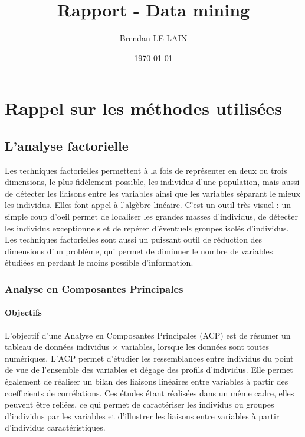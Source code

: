 \documentclass[a4paper]{report}
\title {Rapport - Data mining}
\author {Brendan LE LAIN}
\date{\today}
\begin{document}
 
\pagestyle{headings}
 
\maketitle
 
\chapter{Rappel sur les méthodes utilisées}

\section{L'analyse factorielle}
Les techniques factorielles permettent à la fois de représenter en deux ou trois dimensions, le plus fidèlement possible, les individus d'une population, mais aussi de détecter les liaisons entre les variables ainsi que les variables séparant le mieux les individus. Elles font appel à l'algèbre linéaire. C'est un outil très visuel : un simple coup d'oeil permet de localiser les grandes masses d'individus, de détecter les individus exceptionnels et de repérer d'éventuels groupes isolés d'individus. Les techniques factorielles sont aussi un puissant outil de réduction des dimensions d'un problème, qui permet de diminuer le nombre de variables étudiées en perdant le moins possible d'information.

\subsection{Analyse en Composantes Principales}

\subsubsection{Objectifs}
L'objectif d'une Analyse en Composantes Principales (ACP) est de résumer un tableau de données individus $\times$ variables, lorsque les données sont toutes numériques. L'ACP permet d'étudier les ressemblances entre individus du point de vue de l'ensemble des variables et dégage des profils d'individus. Elle permet également de réaliser un bilan des liaisons linéaires entre variables à partir des coefficients de corrélations. Ces études étant réalisées dans un même cadre, elles peuvent être reliées, ce qui permet de caractériser les individus ou groupes d'individus par les variables et d'illustrer les liaisons entre variables à partir d'individus caractéristiques.
\end{document}
